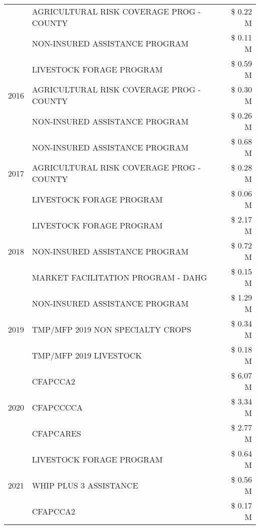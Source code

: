\begin{tabular}{llr}
 & AGRICULTURAL RISK COVERAGE PROG - COUNTY & \$ 0.22 M \\
 & NON-INSURED ASSISTANCE PROGRAM & \$ 0.11 M \\
\cline{1-3}
\multirow[t]{3}{*}{2016} & LIVESTOCK FORAGE PROGRAM & \$ 0.59 M \\
 & AGRICULTURAL RISK COVERAGE PROG - COUNTY & \$ 0.30 M \\
 & NON-INSURED ASSISTANCE PROGRAM & \$ 0.26 M \\
\cline{1-3}
\multirow[t]{3}{*}{2017} & NON-INSURED ASSISTANCE PROGRAM & \$ 0.68 M \\
 & AGRICULTURAL RISK COVERAGE PROG - COUNTY & \$ 0.28 M \\
 & LIVESTOCK FORAGE PROGRAM & \$ 0.06 M \\
\cline{1-3}
\multirow[t]{3}{*}{2018} & LIVESTOCK FORAGE PROGRAM & \$ 2.17 M \\
 & NON-INSURED ASSISTANCE PROGRAM & \$ 0.72 M \\
 & MARKET FACILITATION PROGRAM - DAHG & \$ 0.15 M \\
\cline{1-3}
\multirow[t]{3}{*}{2019} & NON-INSURED ASSISTANCE PROGRAM & \$ 1.29 M \\
 & TMP/MFP 2019 NON SPECIALTY CROPS & \$ 0.34 M \\
 & TMP/MFP 2019 LIVESTOCK & \$ 0.18 M \\
\cline{1-3}
\multirow[t]{3}{*}{2020} & CFAPCCA2 & \$ 6.07 M \\
 & CFAPCCCCA & \$ 3.34 M \\
 & CFAPCARES & \$ 2.77 M \\
\cline{1-3}
\multirow[t]{3}{*}{2021} & LIVESTOCK FORAGE PROGRAM & \$ 0.64 M \\
 & WHIP PLUS 3 ASSISTANCE & \$ 0.56 M \\
 & CFAPCCA2 & \$ 0.17 M \\
\cline{1-3}
\bottomrule
\end{tabular}
